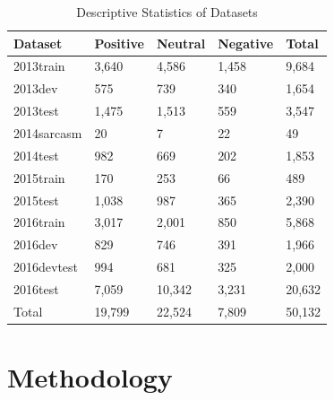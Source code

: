 \documentclass[runningheads]{llncs}
\begin{document}
\begin{table}[!ht]
	\centering
	\caption{Descriptive Statistics of Datasets} 
    \label{tab:3-stat}
	\begin{tabular}{lllll}
		\toprule
        \textbf{Dataset} & \textbf{Positive} & \textbf{Neutral} & \textbf{Negative} & \textbf{Total}\\ 
        \midrule
		2013train   & 3,640     & 4,586    & 1,458     & 9,684  \\
		2013dev     & 575      & 739     & 340      & 1,654  \\
		2013test    & 1,475     & 1,513    & 559      & 3,547  \\
		2014sarcasm & 20       & 7       & 22       & 49    \\
		2014test    & 982      & 669     & 202      & 1,853  \\
		2015train   & 170      & 253     & 66       & 489   \\
		2015test    & 1,038     & 987     & 365      & 2,390 \\
		2016train   & 3,017     & 2,001    & 850      & 5,868  \\
		2016dev     & 829      & 746     & 391      & 1,966  \\
		2016devtest & 994      & 681     & 325      & 2,000  \\
		2016test    & 7,059     & 10,342   & 3,231     & 20,632 \\ 
        \midrule
        Total   & 19,799  & 22,524  & 7,809  &   50,132\\
        \bottomrule
	\end{tabular}
\end{table}


\section{Methodology} \label{sec:method}
\end{document}
